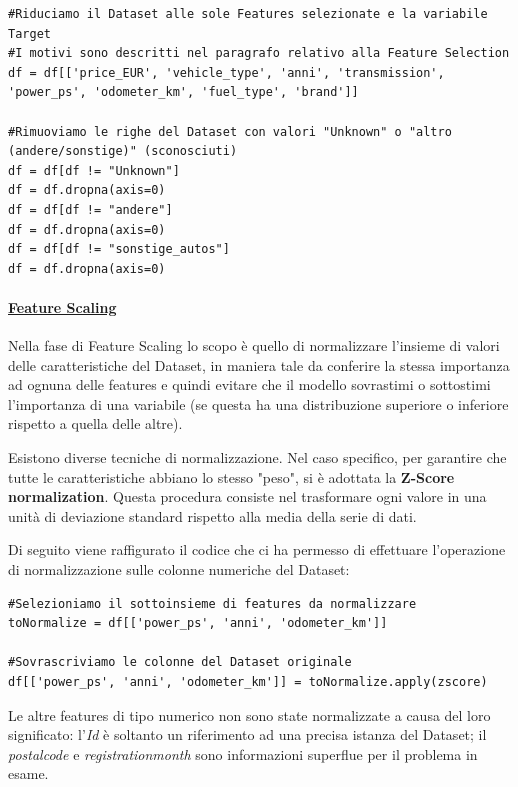 \pagebreak

\begin{lstlisting}
#Riduciamo il Dataset alle sole Features selezionate e la variabile Target
#I motivi sono descritti nel paragrafo relativo alla Feature Selection
df = df[['price_EUR', 'vehicle_type', 'anni', 'transmission', 'power_ps', 'odometer_km', 'fuel_type', 'brand']]

#Rimuoviamo le righe del Dataset con valori "Unknown" o "altro (andere/sonstige)" (sconosciuti)
df = df[df != "Unknown"]
df = df.dropna(axis=0)
df = df[df != "andere"]
df = df.dropna(axis=0)
df = df[df != "sonstige_autos"]
df = df.dropna(axis=0)
\end{lstlisting}
\bigskip
\bigskip

\paragraph{\textcolor[HTML]{000099}{\underline{Feature Scaling}}}
Nella fase di Feature Scaling lo scopo è quello di normalizzare l'insieme di valori delle caratteristiche del Dataset, in maniera tale da conferire la stessa importanza ad ognuna delle features e quindi evitare che il modello sovrastimi o sottostimi l'importanza di una variabile (se questa ha una distribuzione superiore o inferiore rispetto a quella delle altre).

Esistono diverse tecniche di normalizzazione. Nel caso specifico, per garantire che tutte le caratteristiche abbiano lo stesso "peso", si è adottata la \textbf{Z-Score normalization}. Questa procedura consiste nel trasformare ogni valore in una unità di deviazione standard rispetto alla media della serie di dati. 

Di seguito viene raffigurato il codice che ci ha permesso di effettuare l'operazione di normalizzazione sulle colonne numeriche del Dataset:

\begin{lstlisting}
#Selezioniamo il sottoinsieme di features da normalizzare
toNormalize = df[['power_ps', 'anni', 'odometer_km']]

#Sovrascriviamo le colonne del Dataset originale
df[['power_ps', 'anni', 'odometer_km']] = toNormalize.apply(zscore)
\end{lstlisting}
\bigskip

Le altre features di tipo numerico non sono state normalizzate a causa del loro significato: l'\textit{Id} è soltanto un riferimento ad una precisa istanza del Dataset; il \textit{postal\textunderscore code} e \textit{registration\textunderscore month} sono informazioni superflue per il problema in esame.
\pagebreak

